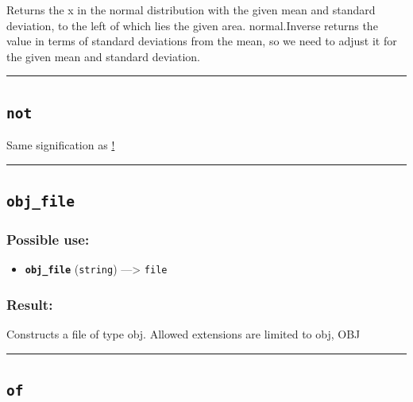 \documentclass[]{book}
\providecommand{\tightlist}{%
  \setlength{\itemsep}{0pt}\setlength{\parskip}{0pt}}
\theoremstyle{definition}
\theoremstyle{definition}
\theoremstyle{definition}
\theoremstyle{remark}
\begin{document}
Returns the x in the normal distribution with the given mean and
standard deviation, to the left of which lies the given area.
normal.Inverse returns the value in terms of standard deviations from
the mean, so we need to adjust it for the given mean and standard
deviation.

\begin{center}\rule{0.5\linewidth}{\linethickness}\end{center}

\subsection{\texorpdfstring{\texttt{not}}{not}}\label{not}

Same signification as \href{operators-a-to-a.html\#!}{!}

\begin{center}\rule{0.5\linewidth}{\linethickness}\end{center}

\subsection{\texorpdfstring{\texttt{obj\_file}}{obj\_file}}\label{obj_file}

\subsubsection{Possible use:}\label{possible-use-380}

\begin{itemize}
\tightlist
\item
  \textbf{\texttt{obj\_file}} (\texttt{string}) ---\textgreater{}
  \texttt{file}
\end{itemize}

\subsubsection{Result:}\label{result-366}

Constructs a file of type obj. Allowed extensions are limited to obj,
OBJ

\begin{center}\rule{0.5\linewidth}{\linethickness}\end{center}

\subsection{\texorpdfstring{\texttt{of}}{of}}\label{of}
\end{document}

